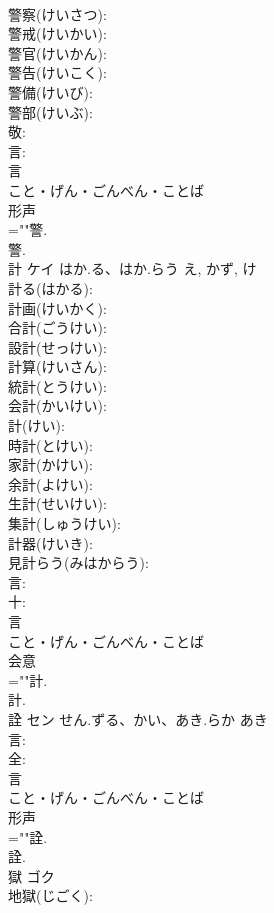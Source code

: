 \documentclass[8pt]{extreport}
\begin{document}
\begin{CJK}{UTF8}{min}
\\	警察(けいさつ): 
\\	警戒(けいかい): 
\\	警官(けいかん): 
\\	警告(けいこく): 
\\	警備(けいび): 
\\	警部(けいぶ): 
\\	敬: 
\\	言: 
\\	言	
\\	こと・げん・ごんべん・ことば	
\\	形声 
\\	=""警.
\\	警.
\\	計	ケイ	はか.る、はか.らう	え, かず, け	
\\	計る(はかる): 
\\	計画(けいかく): 
\\	合計(ごうけい): 
\\	設計(せっけい): 
\\	計算(けいさん): 
\\	統計(とうけい): 
\\	会計(かいけい): 
\\	計(けい): 
\\	時計(とけい): 
\\	家計(かけい): 
\\	余計(よけい): 
\\	生計(せいけい): 
\\	集計(しゅうけい): 
\\	計器(けいき): 
\\	見計らう(みはからう): 
\\	言: 
\\	十: 
\\	言	
\\	こと・げん・ごんべん・ことば	
\\	会意 
\\	=""計.
\\	計.
\\	詮	セン	せん.ずる、かい、あき.らか	あき	
\\	言: 
\\	全: 
\\	言	
\\	こと・げん・ごんべん・ことば	
\\	形声 
\\	=""詮.
\\	詮.
\\	獄	ゴク			
\\	地獄(じごく): 

\end{CJK}
\end{document}
